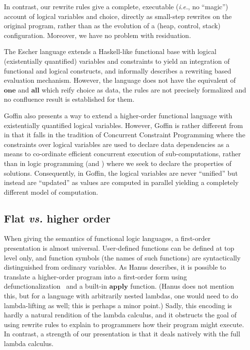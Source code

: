 \documentclass[acmsmall]{acmart}
\newcommand{\ie}{\emph{i.e.}\xspace}	%
\newcommand{\vs}{\emph{vs.}\xspace}
\begin{document}
In contrast, our rewrite rules give a complete, executable (\ie, no ``magic'')
account of logical variables and choice, directly as small-step
rewrites on the original program, rather than as the evolution of a
(heap, control, stack) configuration. Moreover, we have no problem with
residuation.

The Escher language \cite{Escher} extends a Haskell-like functional base with
logical (existentially quantified) variables and constraints to yield an integration
of functional and logical constructs, and informally describes a rewriting based
evaluation mechanism. However, the language does not have the equivalent
of \ensuremath{\textbf{one}} and \ensuremath{\textbf{all}} which reify choice as data, the rules are not precisely
formalized and no confluence result is established for them.

Goffin \cite{Goffin} also presents a way to extend a higher-order functional
language with existentially quantified logical variables. However, Goffin is
rather different from \versecalc{} in that it falls in the tradition of
Concurrent Constraint Programming \cite{Saraswat90} where the constraints
over logical variables are used to declare data dependencies as a means to
co-ordinate efficient concurrent execution of sub-computations, rather
than in logic programming (and \versecalc) where we seek to declare the properties
of solutions. Consequently, in Goffin, the logical variables are never ``unified''
but instead are ``updated'' as values are computed in parallel yielding a completely
different model of computation.

\subsection{Flat {\vs} higher order}

When giving the semantics
of functional logic languages, a first-order presentation is almost universal.
User-defined functions can be defined at top level only,
and function symbols (the names of such functions) are syntactically
distinguished from ordinary variables.
As Hanus describes, it is possible
to translate a higher-order program into a first-order
form using defunctionalization~\cite[Section 3.3]{hanus:survey} and a built-in
\ensuremath{\textbf{apply}} function.
(Hanus does not mention this, but for a language with arbitrarily nested lambdas,
one would need to do lambda-lifting \cite{johnsson:lambdalift} as well; this is perhaps a minor point.)
Sadly, this encoding is hardly a natural rendition of the lambda calculus, and
it obstructs the goal of using rewrite rules to explain to programmers how
their program might execute. In contrast, a strength of our \versecalc{}
presentation is that it deals natively with the full lambda calculus.
\end{document}
